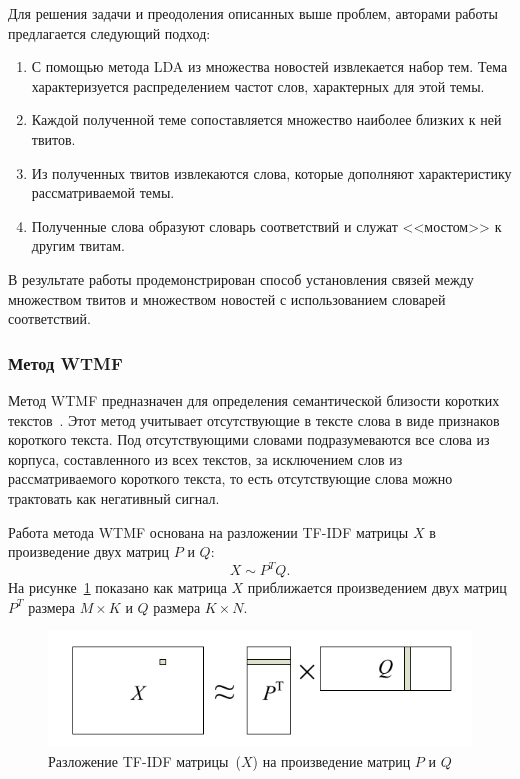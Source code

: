          Для решения задачи и преодоления описанных выше проблем, авторами работы предлагается следующий подход:
         \begin{enumerate}
            \item С помощью метода LDA из множества новостей извлекается набор тем. Тема характеризуется распределением частот слов, характерных для этой темы.
            \item Каждой полученной теме сопоставляется множество наиболее близких к ней твитов.
            \item Из полученных твитов извлекаются слова, которые дополняют характеристику рассматриваемой темы.
            \item Полученные слова образуют словарь соответствий и служат <<мостом>> к другим твитам.
         \end{enumerate}
         В результате работы продемонстрирован способ установления связей между множеством твитов и множеством новостей с использованием словарей соответствий.

    \subsubsection{Метод WTMF}
    \label{subsubsec:wtmf}
        Метод WTMF предназначен для определения семантической близости коротких текстов~\cite{wtmf}.
        Этот метод учитывает отсутствующие в тексте слова в виде признаков короткого текста.
        Под отсутствующими словами подразумеваются все слова из корпуса, составленного из всех текстов, за исключением слов из рассматриваемого короткого текста,
        то есть отсутствующие слова можно трактовать как негативный сигнал.

        Работа метода WTMF основана на разложении TF-IDF матрицы $X$ в произведение двух матриц $P$ и $Q$:
        $$X \sim P^TQ.$$
        На рисунке~\ref{pic:wtmf} показано как матрица $X$ приближается произведением двух матриц $P^T$ размера $M \times K$ и $Q$ размера $K \times N$.

        \begin{figure}[h!]
            \center
            \includegraphics[scale=0.45]{wtmf.png}
            \caption{Разложение TF-IDF матрицы~($X$) на произведение матриц $P$ и $Q$}
            \label{pic:wtmf}
        \end{figure}

